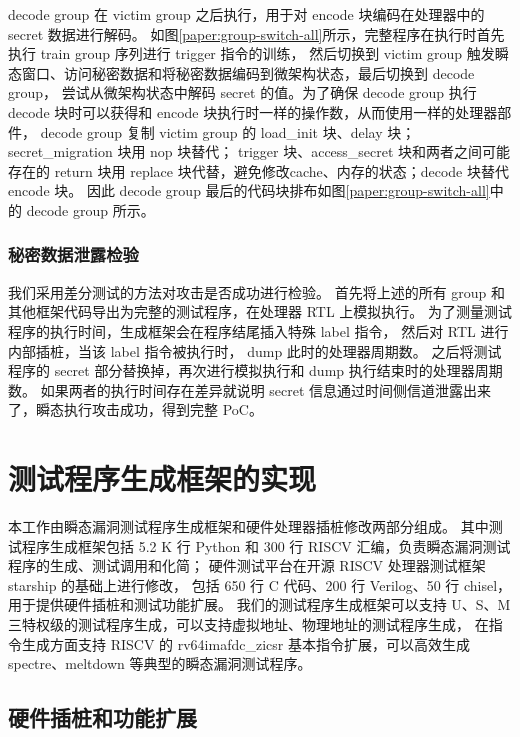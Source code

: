 decode group 在 victim group 之后执行，用于对 encode 块编码在处理器中的 secret 数据进行解码。
如图\ref{paper:group-switch-all}所示，完整程序在执行时首先执行 train group 序列进行 trigger 指令的训练，
然后切换到 victim group 触发瞬态窗口、访问秘密数据和将秘密数据编码到微架构状态，最后切换到 decode group，
尝试从微架构状态中解码 secret 的值。为了确保 decode group 执行 decode 块时可以获得和 encode 块执行时一样的操作数，从而使用一样的处理器部件，
decode group 复制 victim group 的 load\_init 块、delay 块；secret\_migration 块用 nop 块替代；
trigger 块、access\_secret 块和两者之间可能存在的 return 块用 replace 块代替，避免修改cache、内存的状态；decode 块替代 encode 块。
因此 decode group 最后的代码块排布如图\ref{paper:group-switch-all}中的 decode group 所示。\par

\subsubsection{秘密数据泄露检验}

我们采用差分测试的方法对攻击是否成功进行检验。
首先将上述的所有 group 和其他框架代码导出为完整的测试程序，在处理器 RTL 上模拟执行。
为了测量测试程序的执行时间，生成框架会在程序结尾插入特殊 label 指令，
然后对 RTL 进行内部插桩，当该 label 指令被执行时， dump 此时的处理器周期数。
之后将测试程序的 secret 部分替换掉，再次进行模拟执行和 dump 执行结束时的处理器周期数。
如果两者的执行时间存在差异就说明 secret 信息通过时间侧信道泄露出来了，瞬态执行攻击成功，得到完整 PoC。

\cleardoublepage
\section{测试程序生成框架的实现}

本工作由瞬态漏洞测试程序生成框架和硬件处理器插桩修改两部分组成。
其中测试程序生成框架包括 5.2 K 行 Python 和 300 行 RISCV 汇编，负责瞬态漏洞测试程序的生成、测试调用和化简；
硬件测试平台在开源 RISCV 处理器测试框架 starship\cite{starship} 的基础上进行修改，
包括 650 行 C 代码、200 行 Verilog、50 行 chisel，用于提供硬件插桩和测试功能扩展。
我们的测试程序生成框架可以支持 U、S、M 三特权级的测试程序生成，可以支持虚拟地址、物理地址的测试程序生成，
在指令生成方面支持 RISCV 的 rv64imafdc\_zicsr 基本指令扩展，可以高效生成 spectre、meltdown 等典型的瞬态漏洞测试程序。\par

\subsection{硬件插桩和功能扩展}

